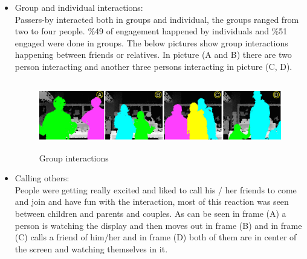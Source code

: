 \begin{enumerate}
\begin{itemize}
\item Group and individual interactions: \\
Passers-by interacted both in groups and individual, the groups ranged from two to four people. \%49 of engagement happened by individuals and \%51 engaged were done in groups. 
The below pictures show group interactions happening between friends or relatives. In picture (A and B) there are two person interacting and another three persons interacting in picture (C, D).


\begin{minipage}{0.89\textwidth}
\begin{flushright}
\begin{figure}[H]
    \centering
    \includegraphics[width=\textwidth,height=30mm]{Figures/8/body_inter_findings/effects/group}
    \caption{Group interactions}
    \label{fig:group_interaction}
\end{figure}
\end{flushright}
\end{minipage}







\item Calling others: \\
People were getting really excited and liked to call his / her friends to come and join and have fun with the interaction, most of this reaction was seen between children and parents and couples. As can be seen in frame (A) a person is watching the display and then moves out in frame (B) and in frame (C) calls a friend of him/her and in frame (D) both of them are in center of the screen and watching themselves in it.


\end{itemize}
\end{enumerate}
